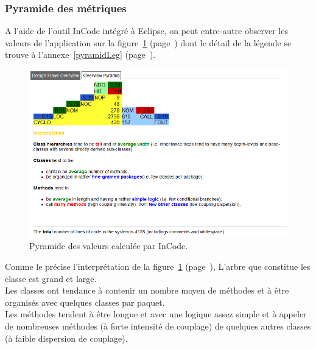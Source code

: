 \documentclass[12pt,a4paper,final]{article}
\newcommand{\annexe}[1]{annexe~\ref{#1} (page~\pageref{#1})}
\newcommand{\labelfigure}[1]{figure~\ref{#1} (page~\pageref{#1})}
\begin{document}
\subsubsection{Pyramide des métriques}
A l'aide de l'outil InCode intégré à Eclipse, on peut entre-autre observer les valeurs de l'application sur la \labelfigure{pyramid} dont le détail de la légende se trouve à l'\annexe{pyramidLeg}.
\begin{figure}[!h]
	\centering
	\includegraphics[width=\textwidth]{InCodePyramid.png}
	\caption{\label{pyramid}Pyramide des valeurs calculée par InCode.}
\end{figure}
Comme le précise l'interprétation de la \labelfigure{pyramid}, L'arbre que constitue les classe est grand et large.\\
Les classes ont tendance à contenir un nombre moyen de méthodes et à être organisés avec quelques classes par paquet.\\
Les méthodes tendent à être longue et avec une logique assez simple et à appeler de nombreuses méthodes (à forte intensité de couplage) de quelques autres classes (à faible dispersion de couplage).


\clearpage
\end{document}
